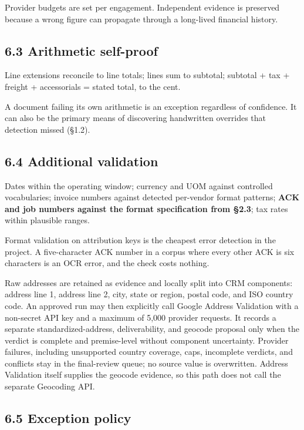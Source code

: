 \documentclass[
]{article}
\begin{document}
Provider budgets are set per engagement. Independent evidence is
preserved because a wrong figure can propagate through a long-lived
financial history.

\subsection{6.3 Arithmetic self-proof}\label{arithmetic-self-proof}

Line extensions reconcile to line totals; lines sum to subtotal;
subtotal + tax + freight + accessorials = stated total, to the cent.

A document failing its own arithmetic is an exception regardless of
confidence. It can also be the primary means of discovering handwritten
overrides that detection missed (§1.2).

\subsection{6.4 Additional validation}\label{additional-validation}

Dates within the operating window; currency and UOM against controlled
vocabularies; invoice numbers against detected per-vendor format
patterns; \textbf{ACK and job numbers against the format specification
from §2.3}; tax rates within plausible ranges.

Format validation on attribution keys is the cheapest error detection in
the project. A five-character ACK number in a corpus where every other
ACK is six characters is an OCR error, and the check costs nothing.

Raw addresses are retained as evidence and locally split into CRM
components: address line 1, address line 2, city, state or region,
postal code, and ISO country code. An approved run may then explicitly
call Google Address Validation with a non-secret API key and a maximum
of 5,000 provider requests. It records a separate standardized-address,
deliverability, and geocode proposal only when the verdict is complete
and premise-level without component uncertainty. Provider failures,
including unsupported country coverage, caps, incomplete verdicts, and
conflicts stay in the final-review queue; no source value is
overwritten. Address Validation itself supplies the geocode evidence, so
this path does not call the separate Geocoding API.

\subsection{6.5 Exception policy}\label{exception-policy}
\end{document}
